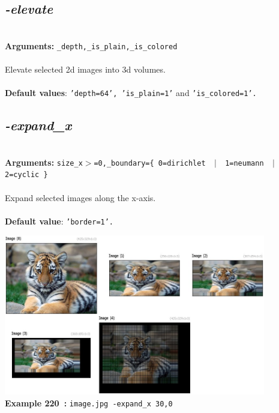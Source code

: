 \documentclass[a4paper,11pt,twoside]{book}
\begin{document}
\subsection{\emph{-elevate} }\vspace*{-0.5em}
~\\\textbf{Arguments: } 
{\small \texttt{\_depth,\_is\_plain,\_is\_colored}}\\~\\
Elevate selected 2d images into 3d volumes.
~\\~\\\textbf{Default values}: {\small \texttt{'depth=64', 'is\_plain=1'} and \texttt{'is\_colored=1'.}}


\subsection{\emph{-expand\_x} }\vspace*{-0.5em}
~\\\textbf{Arguments: } 
{\small \texttt{size\_x$>$=0,\_boundary=\{ 0=dirichlet ~$|$~ 1=neumann ~$|$~ 2=cyclic \}}}\\~\\
Expand selected images along the x-axis.
~\\~\\\textbf{Default value}: {\small \texttt{'border=1'.}}
\begin{center}\includegraphics[keepaspectratio=true,height=7cm,width=\textwidth]{img/gmic_def220.jpg}\\
{\footnotesize \textbf{Example 220~:} \texttt{image.jpg -expand\_x 30,0}}
\end{center}
\end{document}
